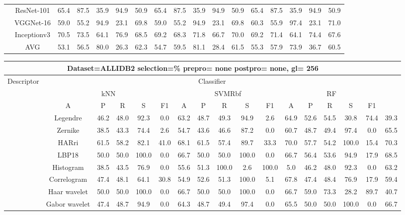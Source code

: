\documentclass[12pt,italian]{article}
\begin{document}
\begin{tiny}
\begin{longtable}{lcccccccccccccccc}
& ResNet-101 & 65.4 & 87.5 & 35.9 & 94.9 & 50.9 & 65.4 & 87.5 & 35.9 & 94.9 & 50.9 & 65.4 & 87.5 & 35.9 & 94.9 & 50.9 \\ 
& VGGNet-16 & 59.0 & 55.2 & 94.9 & 23.1 & 69.8 & 59.0 & 55.2 & 94.9 & 23.1 & 69.8 & 60.3 & 55.9 & 97.4 & 23.1 & 71.0 \\ 
& Inceptionv3 & 70.5 & 73.5 & 64.1 & 76.9 & 68.5 & 69.2 & 68.3 & 71.8 & 66.7 & 70.0 & 69.2 & 71.4 & 64.1 & 74.4 & 67.6 \\ 
\hline
& AVG & 53.1 & 56.5 & 80.0 & 26.3 & 62.3 & 54.7 & 59.5 & 81.1 & 28.4 & 61.5 & 55.3 & 57.9 & 73.9 & 36.7 & 60.5 \\ 
\hline
\bottomrule
\end{longtable} 

 \pagebreak 
\begin{longtable}{lcccccccccccccccc}
\toprule
\multicolumn{16}{c}{Dataset=ALLIDB2 selection=\% prepro= none postpro= none, gl= 256} \\ 
\toprule
Descriptor & \multicolumn{15}{c}{Classifier} \\ 
& \multicolumn{5}{c}{kNN} & \multicolumn{5}{c}{SVMRbf} & \multicolumn{5}{c}{RF} \\ 
& A & P & R & S & F1 & A & P & R & S & F1 & A & P & R & S & F1 \\ 
\midrule
& Legendre & 46.2 & 48.0 & 92.3 &  0.0 & 63.2 & 48.7 & 49.3 & 94.9 &  2.6 & 64.9 & 52.6 & 54.5 & 30.8 & 74.4 & 39.3 \\ 
& Zernike & 38.5 & 43.3 & 74.4 &  2.6 & 54.7 & 43.6 & 46.6 & 87.2 &  0.0 & 60.7 & 48.7 & 49.4 & 97.4 &  0.0 & 65.5 \\ 
& HARri & 61.5 & 58.2 & 82.1 & 41.0 & 68.1 & 61.5 & 57.4 & 89.7 & 33.3 & 70.0 & 57.7 & 54.2 & 100.0 & 15.4 & 70.3 \\ 
& LBP18 & 50.0 & 50.0 & 100.0 &  0.0 & 66.7 & 50.0 & 50.0 & 100.0 &  0.0 & 66.7 & 56.4 & 53.6 & 94.9 & 17.9 & 68.5 \\ 
& Histogram & 38.5 & 43.5 & 76.9 &  0.0 & 55.6 & 51.3 & 100.0 &  2.6 & 100.0 &  5.0 & 46.2 & 48.0 & 92.3 &  0.0 & 63.2 \\ 
& Correlogram & 47.4 & 48.1 & 64.1 & 30.8 & 54.9 & 52.6 & 51.3 & 100.0 &  5.1 & 67.8 & 47.4 & 48.4 & 76.9 & 17.9 & 59.4 \\ 
& Haar wavelet & 50.0 & 50.0 & 100.0 &  0.0 & 66.7 & 50.0 & 50.0 & 100.0 &  0.0 & 66.7 & 59.0 & 73.3 & 28.2 & 89.7 & 40.7 \\ 
& Gabor wavelet & 47.4 & 48.7 & 94.9 &  0.0 & 64.3 & 48.7 & 49.4 & 97.4 &  0.0 & 65.5 & 50.0 & 50.0 & 100.0 &  0.0 & 66.7 \\ 

\end{longtable}
\end{tiny}
\end{document}
